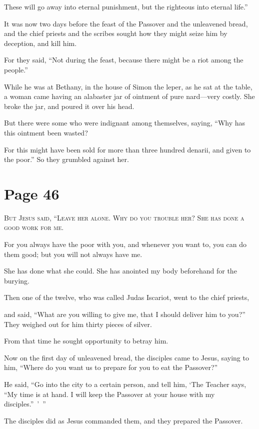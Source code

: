 These will go away into eternal punishment, but the righteous into eternal life.”

It was now two days before the feast of the Passover and the unleavened bread, and the chief priests and the scribes sought how they might seize him by deception, and kill him.

For they said, “Not during the feast, because there might be a riot among the people.”

While he was at Bethany, in the house of Simon the leper, as he sat at the table, a woman came having an alabaster jar of ointment of pure nard—very costly. She broke the jar, and poured it over his head.

But there were some who were indignant among themselves, saying, “Why has this ointment been wasted?

For this might have been sold for more than three hundred denarii,  and given to the poor.” So they grumbled against her.



\chapterornament
\section*{Page 46}

\lettrine{B}{ut Jesus said, “Leave her alone. Why do you trouble her? She has done a good work for me.}

For you always have the poor with you, and whenever you want to, you can do them good; but you will not always have me.

She has done what she could. She has anointed my body beforehand for the burying.

Then one of the twelve, who was called Judas Iscariot, went to the chief priests,

and said, “What are you willing to give me, that I should deliver him to you?” They weighed out for him thirty pieces of silver.

From that time he sought opportunity to betray him.

Now on the first day of unleavened bread, the disciples came to Jesus, saying to him, “Where do you want us to prepare for you to eat the Passover?”

He said, “Go into the city to a certain person, and tell him, ‘The Teacher says, “My time is at hand. I will keep the Passover at your house with my disciples.” ’ ”

The disciples did as Jesus commanded them, and they prepared the Passover.

